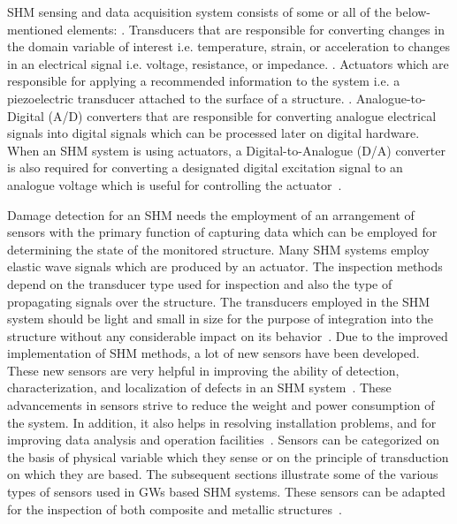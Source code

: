 \documentclass[b5paper, 11pt, titlepage]{book}
\begin{document}
SHM sensing and data acquisition system consists of some or all of the below-mentioned elements:
. Transducers that are responsible for converting changes in the domain variable of interest i.e. temperature, strain, or acceleration to changes in an electrical signal i.e. voltage, resistance, or impedance.
. Actuators which are responsible for applying a recommended information to the system i.e. a piezoelectric transducer attached to the surface of a structure.
. Analogue-to-Digital (A/D) converters that are responsible for converting analogue electrical signals into digital signals which can be processed later on digital hardware. When an SHM system is using actuators, a Digital-to-Analogue (D/A) converter is also required for converting a designated digital excitation signal to an analogue voltage which is useful for controlling the actuator~\cite{TibaduizaBurgos2020, Farrar2012}. 

Damage detection for an SHM needs the employment of an arrangement of sensors with the primary function of capturing data which can be employed for determining the state of the monitored structure. Many SHM systems employ elastic wave signals which are produced by an actuator. The inspection methods depend on the transducer type used for inspection and also the type of propagating signals over the structure. The transducers employed in the SHM system should be light and small in size for the purpose of integration into the structure without any considerable impact on its behavior~\cite{stepinski2013advanced}. Due to the improved implementation of SHM methods, a lot of new sensors have been developed. These new sensors are very helpful in improving the ability of detection, characterization, and localization of defects in an SHM system~\cite{Das2018}. These advancements in sensors strive to reduce the weight and power consumption of the system. In addition, it also helps in resolving installation problems, and for improving data analysis and operation facilities~\cite{TibaduizaBurgos2020}. Sensors can be categorized on the basis of physical variable which they sense or on the principle of transduction on which they are based. The subsequent sections illustrate some of the various types of sensors used in GWs based SHM systems. These sensors can be adapted for the inspection of both composite and metallic structures~\cite{Farrar2012,TibaduizaBurgos2020, Mitra2016}.
\end{document}
